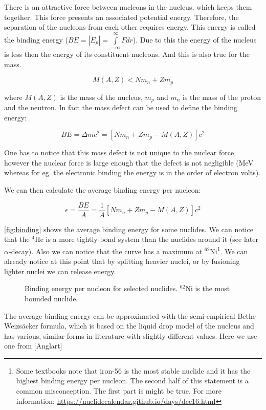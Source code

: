 There is an attractive force between nucleons in the nucleus, which keeps them together. This force presents an associated potential energy. Therefore, the separation of the nucleons from each other requires energy. This energy is called the binding energy ($BE=|E_p|=\int\limits_{-\infty}^\infty Fdr$). Due to this the energy of the nucleus is less then the energy of its constituent nucleons. And this is also true for the mass. 

\[
M(A,Z)<Nm_n+Zm_p
\]

\noindent where $M(A,Z)$ is the mass of the nucleus, $m_p$ and $m_n$ is the mass of the proton and the neutron. In fact the mass defect can be used to define the binding energy:

\[
BE=\Delta mc^2=[Nm_n+Zm_p-M(A,Z)]c^2
\]

One has to notice that this mass defect is not unique to the nuclear force, however the nuclear force is large enough that the defect is not negligible (MeV whereas for eg. the electronic binding the energy is in the order of electron volts).

We can then calculate the average binding energy per nucleon:

\[
\epsilon=\frac{BE}{A}=\frac{1}{A}[Nm_n+Zm_p-M(A,Z)]c^2
\]

\autoref{fig:binding} shows the average binding energy for some nuclides. We can notice that the ${}^4$He is a more tightly bond system than the nuclides around it (see later $\alpha$-decay). Also we can notice that the curve has a maximum at ${}^{62}$Ni\footnote{Some textbooks note that iron-56 is the most stable nuclide and it has the highest binding energy per nucleon. The second half of this statement is a common misconception. The first part is might be true. For more information: \url{https://nuclidecalendar.github.io/days/dec16.html}}. We can already notice at this point that by splitting heavier nuclei, or by fusioning lighter nuclei we can release energy.


\begin{figure}[ht!]
\protect {}\protect
\caption{\label{fig:binding} \footnotesize{Binding energy per nucleon for selected nuclides. ${}^{62}\text{Ni}$ is the most bounded nuclide.}}
\end{figure}


The average binding energy can be approximated with the semi-empirical Bethe–Weizs\"acker formula, which is based on the liquid drop model of the nucleus and has various, similar forms in literature with slightly different values. Here we use one from [Anglart]

